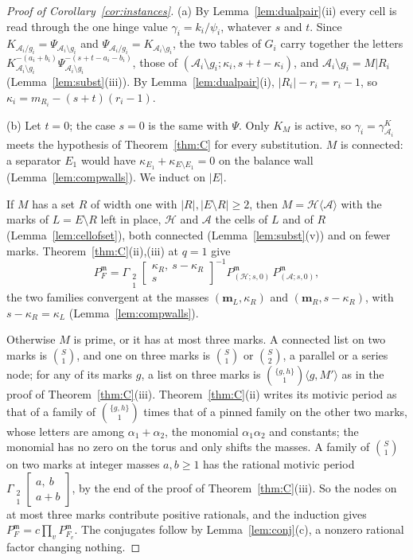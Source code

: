 \documentclass[11pt]{article}
\theoremstyle{plain}
\theoremstyle{definition}
\theoremstyle{remark}
\newcommand{\m}{\mathfrak m}
\newcommand{\bm}{\mathbf m}
\newcommand{\Gst}[4]{\Gamma_{\substack{#1\\#2}}\!\begin{bmatrix}#3\\#4\end{bmatrix}}
\begin{document}
\begin{proof}[Proof of Corollary~\ref{cor:instances}]
(a) By Lemma~\ref{lem:dualpair}(ii) every cell is read through the one hinge value $\gamma_i=k_i/\psi_i$, whatever $s$ and $t$. Since $K_{\mathcal A_i/g_i}=\Psi_{\mathcal A_i\setminus g_i}$ and $\Psi_{\mathcal A_i/g_i}=K_{\mathcal A_i\setminus g_i}$, the two tables of $G_i$ carry together the letters $K_{\mathcal A_i\setminus g_i}^{-(a_i+b_i)}\Psi_{\mathcal A_i\setminus g_i}^{-(s+t-a_i-b_i)}$, those of $(\mathcal A_i\setminus g_i;\kappa_i,s+t-\kappa_i)$, and $\mathcal A_i\setminus g_i=M|R_i$ (Lemma~\ref{lem:subst}(iii)). By Lemma~\ref{lem:dualpair}(i), $|R_i|-r_i=r_i-1$, so $\kappa_i=m_{R_i}-(s+t)(r_i-1)$.

(b) Let $t=0$; the case $s=0$ is the same with $\Psi$. Only $K_M$ is active, so $\gamma_i=\gamma^K_{\mathcal A_i}$ meets the hypothesis of Theorem~\ref{thm:C} for every substitution. $M$ is connected: a separator $E_1$ would have $\kappa_{E_1}+\kappa_{E\setminus E_1}=0$ on the balance wall (Lemma~\ref{lem:compwalls}). We induct on $|E|$.

If $M$ has a set $R$ of width one with $|R|,|E\setminus R|\ge2$, then $M=\mathcal H\langle\mathcal A\rangle$ with the marks of $L=E\setminus R$ left in place, $\mathcal H$ and $\mathcal A$ the cells of $L$ and of $R$ (Lemma~\ref{lem:cellofset}), both connected (Lemma~\ref{lem:subst}(v)) and on fewer marks. Theorem~\ref{thm:C}(ii),(iii) at $q=1$ give
\[
P_F^{\m}=\Gst21{\kappa_R,\ s-\kappa_R}{s}^{-1}P^{\m}_{(\mathcal H;s,0)}\,P^{\m}_{(\mathcal A;s,0)},
\]
the two families convergent at the masses $(\bm_L,\kappa_R)$ and $(\bm_R,s-\kappa_R)$, with $s-\kappa_R=\kappa_L$ (Lemma~\ref{lem:compwalls}).

Otherwise $M$ is prime, or it has at most three marks. A connected list on two marks is $\binom S1$, and one on three marks is $\binom S1$ or $\binom S2$, a parallel or a series node; for any of its marks $g$, a list on three marks is $\binom{\{g,h\}}1\langle g,M'\rangle$ as in the proof of Theorem~\ref{thm:C}(iii). Theorem~\ref{thm:C}(ii) writes its motivic period as that of a family of $\binom{\{g,h\}}1$ times that of a pinned family on the other two marks, whose letters are among $\alpha_1+\alpha_2$, the monomial $\alpha_1\alpha_2$ and constants; the monomial has no zero on the torus and only shifts the masses. A family of $\binom S1$ on two marks at integer masses $a,b\ge1$ has the rational motivic period $\Gst21{a,\ b}{a+b}$, by the end of the proof of Theorem~\ref{thm:C}(iii). So the nodes on at most three marks contribute positive rationals, and the induction gives $P_F^{\m}=c\prod_vP^{\m}_{F_v}$. The conjugates follow by Lemma~\ref{lem:conj}(c), a nonzero rational factor changing nothing.
\end{proof}
\end{document}
